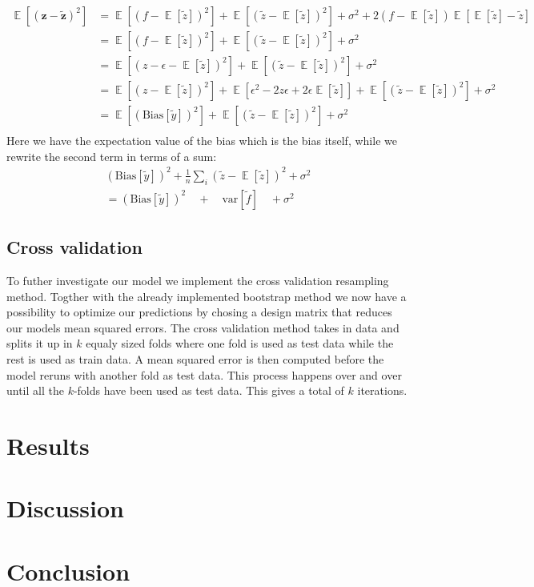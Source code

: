 \documentclass[12pt]{article}
\DeclareMathOperator*{\E}{\mathbb{E}}
\begin{document}
\begin{align*}
  \E[(\boldsymbol{z}- \boldsymbol{\tilde{z}})^2] &=\E[(f -\E[\tilde{z}])^2] +\E[( \tilde{z} -\E[\tilde{z}])^2]  + \sigma^2+ 2(f-\E[\tilde{z}])\E[\E[\tilde{z}] -\tilde{z}]\\
  &=\E[(f -\E[\tilde{z}])^2]  + \E[( \tilde{z} -\E[\tilde{z}])^2]+\sigma^2\\
  &=\E[(z - \epsilon -\E[\tilde{z}])^2] + \E[( \tilde{z} -\E[\tilde{z}])^2]+\sigma^2 \\
  &=\E[(z  -\E[\tilde{z}])^2] + \E[\epsilon^2-2z\epsilon + 2\epsilon\E[\tilde{z}]]+ \E[( \tilde{z} -\E[\tilde{z}])^2] +\sigma^2 \\
  &= \E[(\text{Bias}[\tilde{y}])^2] + \E[(\tilde{z} -\E[\tilde{z}])^2] +\sigma^2\\
\end{align*}
Here we have the expectation value of the bias which is the bias itself, while we rewrite the second term in terms of a sum:
\begin{align*}
  (\text{Bias}[\tilde{y}])^2 + \frac{1}{n}\sum_i(\tilde{z} -\E[\tilde{z}])^2 +\sigma^2 \\
  = (\text{Bias}[\tilde{y}])^2 \quad + \quad \text{var}[\tilde{f}] \quad +  \sigma^2
\end{align*}

\subsection{Cross validation}
To futher investigate our model we implement the cross validation resampling method. Togther with the already implemented bootstrap method we now have a possibility to optimize our predictions by chosing a design matrix that reduces our models mean squared errors. The cross validation method takes in data and splits it up in $k$ equaly sized folds where one fold is used as test data while the rest is used as train data. A mean squared error is then computed before the model reruns with another fold as test data. This process happens over and over until all the $k$-folds have been used as test data. This gives a total of $k$ iterations. 

\section{Results}
\section{Discussion}
\section{Conclusion}

\section{}
\end{document}
